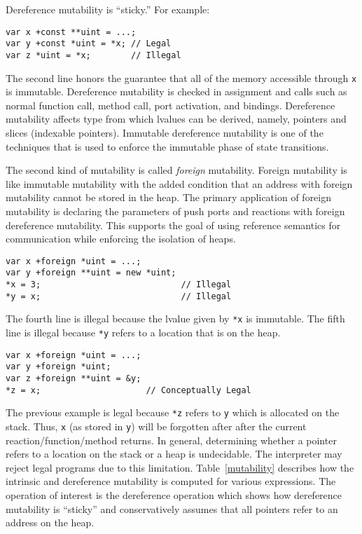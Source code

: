 Dereference mutability is ``sticky.''
For example:
\begin{verbatim}
var x +const **uint = ...;
var y +const *uint = *x; // Legal
var z *uint = *x;        // Illegal
\end{verbatim}
The second line honors the guarantee that all of the memory accessible through \verb+x+ is immutable.
Dereference mutability is checked in assignment and calls such as normal function call, method call, port activation, and bindings.
Dereference mutability affects type from which lvalues can be derived, namely, pointers and slices (indexable pointers).
Immutable dereference mutability is one of the techniques that is used to enforce the immutable phase of state transitions.

The second kind of mutability is called \emph{foreign} mutability.
Foreign mutability is like immutable mutability with the added condition that an address with foreign mutability cannot be stored in the heap.
The primary application of foreign mutability is declaring the parameters of push ports and reactions with foreign dereference mutability.
This supports the goal of using reference semantics for communication while enforcing the isolation of heaps.
\begin{verbatim}
var x +foreign *uint = ...;
var y +foreign **uint = new *uint;
*x = 3;                            // Illegal
*y = x;                            // Illegal
\end{verbatim}
The fourth line is illegal because the lvalue given by \verb+*x+ is immutable.
The fifth line is illegal because \verb+*y+ refers to a location that is on the heap.
\begin{verbatim}
var x +foreign *uint = ...;
var y +foreign *uint;
var z +foreign **uint = &y;
*z = x;                     // Conceptually Legal
\end{verbatim}
The previous example is legal because \verb+*z+ refers to \verb+y+ which is allocated on the stack.
Thus, \verb+x+ (as stored in \verb+y+) will be forgotten after after the current reaction/function/method returns.
In general, determining whether a pointer refers to a location on the stack or a heap is undecidable.
The interpreter may reject legal programs due to this limitation.
Table~\ref{mutability} describes how the intrinsic and dereference mutability is computed for various expressions.
The operation of interest is the dereference operation which shows how dereference mutability is ``sticky'' and conservatively assumes that all pointers refer to an address on the heap.

